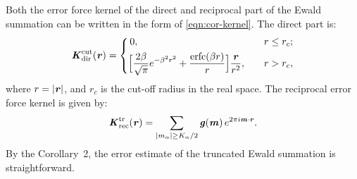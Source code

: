 \documentclass[journal=jacsat,manuscript=article]{achemso}
\renewcommand{\v}[1]{\textbf{\textit{#1}}}
\begin{document}
Both the error force kernel of the direct and reciprocal
part of the Ewald summation can be
written in the form of \ref{eqn:cor-kernel}.  The direct
part is:
\begin{align}
  \v K^{\textrm{cut}}_{\textrm{dir}}(\v r) =
  \left\{
    \begin{aligned}
      &\,0, &\quad & r \leq r_c;\\
      &
      \Big[
      \frac{2\beta}{\sqrt\pi} e^{-\beta^2r^2} + \frac{\textrm{erfc}(\beta r)}{r}
      \Big]\frac{\v r}{r^2}
      ,& & r > r_c,
    \end{aligned}
  \right.
\end{align}
where $r = \vert\v r\vert$, and $r_c$ is the cut-off radius in the
real space.
The reciprocal error force kernel is given by:
\begin{align}
  \v K^{\textrm{tr}}_{\textrm{rec}}(\v r) =
  \sum_{
      \vert m_\alpha\vert \geq K_\alpha/2}
  \v g(\v m) \,
  e^{2\pi i\v m\cdot\v r}.
\end{align}
By the
Corollary~2,
the error estimate of the
truncated Ewald summation is straightforward.


\end{document}
